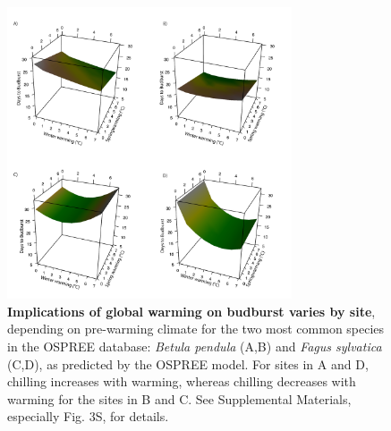 \documentclass{article}
\begin{document}
\begin{figure}[h!]
\centering
\noindent \includegraphics[width=0.75\textwidth]{..//..//analyses/bb_analysis/figures/forecasting/bbmod_3dplot_utah_obs.pdf}
\caption{\textbf{Implications of global warming on budburst varies by site}, depending on pre-warming climate for the two most common species in the OSPREE database: \emph{Betula pendula} (A,B) and \emph{Fagus sylvatica} (C,D), as predicted by the OSPREE model. For sites in A and D, chilling increases with warming, whereas chilling decreases with warming for the sites in B and C. See Supplemental Materials, especially Fig. 3S, for details.}
\label{fig:fore}
\end{figure}

\end{document}
